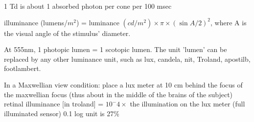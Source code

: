 \item 1 Td is about 1 absorbed photon per cone per 100 msec

\item  illuminance (lumens/$m^2$) = luminance $(cd/ m^2) \times \pi
\times (\sin A/2) ^ 2$, where A is the visual angle of the stimulus' diameter.


\item At 555nm, 1 photopic lumen = 1 scotopic lumen.
The unit 'lumen' can be replaced by any other luminance unit, such as
lux, candela, nit, Troland, apostilb, footlambert.

\item In a Maxwellian view condition: place a lux meter at 10 cm
behind the focus of the maxwellian focus (thus about in the middle of
the brains of the subject) retinal illuminance [in troland] = $10^-4
\times $ the illumination on the lux meter (full illuminated sensor)
0.1 log unit is 27\%

\ee
